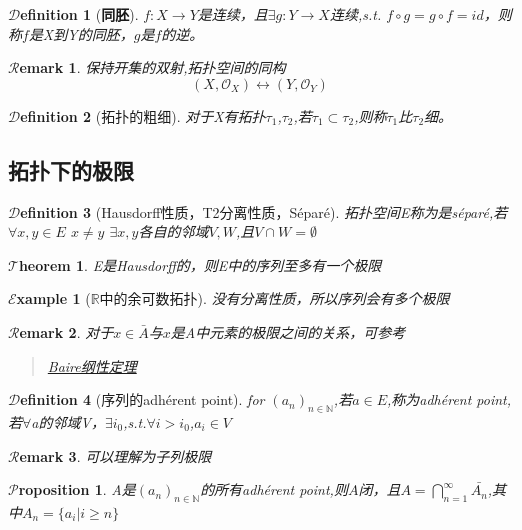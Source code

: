 \documentclass[hyperfer,UTF8,a4paper,12pt]{article}
\theoremstyle{plain}
\newtheorem{Thm}{$\mathcal{T}$heorem}
\newtheorem*{Prop}{$\mathcal{P}$roposition}
\newtheorem*{Remark}{$\mathcal{R}$emark}
\newtheorem{Def}{{$\mathcal{D}$efinition}}[section]
\newtheorem*{Example}{$\mathcal{E}$xample}
\begin{document}
\begin{Def}[\textbf{同胚}]
	$ f:X\to Y $是连续，且$ \exists g:Y\to X $连续,s.t. $ f\circ g=g\circ f=id $，则称$ f $是X到Y的同胚，$ g $是$ f $的逆。
\end{Def}

\begin{Remark}
	保持开集的双射,拓扑空间的同构
	\[  (X,\mathcal{O}_X)\leftrightarrow(Y,\mathcal{O}_Y)   \]
\end{Remark}

\begin{Def}[拓扑的粗细]
	对于X有拓扑$ \tau_1 $,$\tau_2$,若$ \tau_1\subset\tau_2 $,则称$ \tau_1 $比$ \tau_2 $细。
\end{Def}

\subsection{拓扑下的极限}

\begin{Def}[Hausdorff性质，T2分离性质，Séparé]
	拓扑空间E称为是séparé,若$ \forall x,y\in E $ $ x\not=y $ $ \exists x,y $各自的邻域$ V,W $,且$ V\cap W=\emptyset $
\end{Def}

\begin{Thm}
	E是Hausdorff的，则E中的序列至多有一个极限
\end{Thm}

\begin{Example}[$ \mathbb{R} $中的余可数拓扑]
	没有分离性质，所以序列会有多个极限
\end{Example}

\begin{Remark}
	对于$ x\in\bar{A} $与$ x $是A中元素的极限之间的关系，可参考
	\begin{quote}
		\href{wikipedia.org}{Baire纲性定理}
	\end{quote}
\end{Remark}

\begin{Def}[序列的adhérent point]
	for $(a_n)_{n\in\mathbb{N}} $,若$ a\in E $,称为adhérent point,若$ \forall  $a的邻域V，$ \exists i_0 $,s.t.$ \forall i>i_0 $,$ a_i\in V $
\end{Def}
\begin{Remark}
	可以理解为子列极限
\end{Remark}
\begin{Prop}
	A是$(a_n)_{n\in\mathbb{N}} $的所有adhérent point,则$ A $闭，且$ A=\bigcap\limits^{\infty}_{n=1} \bar{A_n} $,其中$ A_n=\{ a_i|i\geq n \} $
\end{Prop}
\end{document}

